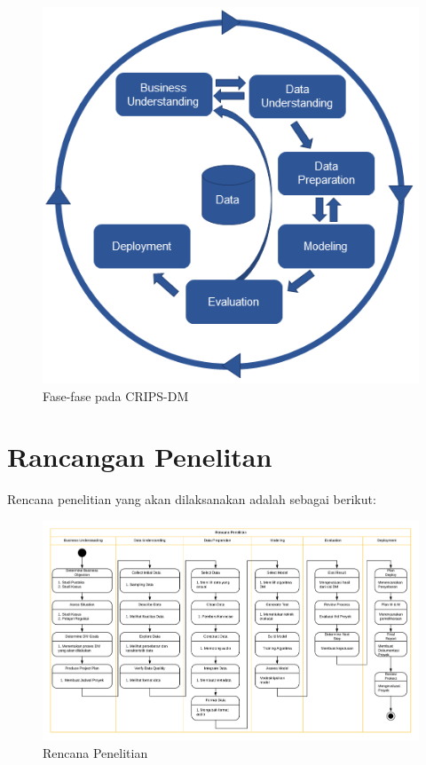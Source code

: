 \begin{figure}[h]
	\centering
	\includegraphics[width=0.7\linewidth]{Gambar/crisp-dm}
	\caption{Fase-fase pada CRIPS-DM}
	\label{fig:crisp-dm}
\end{figure}


\newpage
\section{Rancangan Penelitan}

Rencana penelitian yang akan dilaksanakan adalah sebagai berikut:
\begin{figure}[H]
	\centering
	\includegraphics[width=1\linewidth]{Gambar/rencana-penelitian}
	\caption{Rencana Penelitian}
	\label{fig:rencana-penelitian}
\end{figure}


